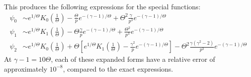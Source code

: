 \documentclass[11pt,a4paper]{article}
\begin{document}
This produces the following expressions for the special functions:
\begin{align}
\psi_0 &\sim e^{1/\Theta}K_0\left(\frac{1}{\Theta}\right) - \frac{\Theta}{p} e^{-(\gamma-1)/\Theta} + \Theta^2\frac{\gamma}{ p^3}e^{-(\gamma-1)/\Theta} \nonumber \\
\psi_1 &\sim e^{1/\Theta}K_1\left(\frac{1}{\Theta}\right) - \Theta \frac{\gamma}{p}e^{-(\gamma-1)/\Theta} +\frac{\Theta^2 }{p^3}e^{-(\gamma-1)/\Theta}  \\
\psi_2 &\sim e^{1/\Theta}K_0\left(\frac{1}{\Theta}\right) + \Theta\left[ e^{1/\Theta} K_1\left(\frac{1}{\Theta}\right)  - \frac{\gamma^2}{p}e^{-(\gamma-1)/\Theta}\right] - \Theta^2 \frac{\gamma(\gamma^2-2)}{p^3} e^{-(\gamma-1)/\Theta}\nonumber
\end{align}
At $\gamma-1 = 10\Theta$, each of these expanded forms have a relative error of approximately $10^{-8}$, compared to the exact expressions.
\end{document}
